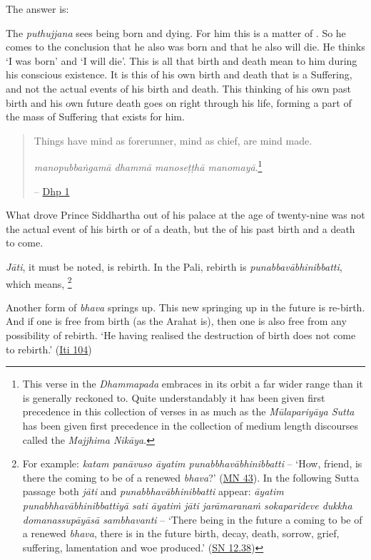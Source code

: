 The answer is:

The \emph{puthujjana} sees  being born and dying. For him this is a matter of . So he comes to the conclusion that he also was born and that he also will die. He thinks `I was born' and `I will die'. This is all that birth and death mean to him during his conscious existence. It is this  of his own birth and death that is a  Suffering, and not the actual events of his birth and death. This thinking of his own past birth and his own future death goes on right through his life, forming a part of the mass of Suffering that exists for him.

\begin{quote}
Things have mind as forerunner, mind as chief, are mind made.

\emph{manopubbaṅgamā dhammā manoseṭṭhā manomayā}.\footnote{This verse in the \emph{Dhammapada} embraces in its orbit a far wider range than it is generally reckoned to. Quite understandably it has been given first precedence in this collection of verses in as much as the \emph{Mūlapariyāya Sutta} has been given first precedence in the collection of medium length discourses called the \emph{Majjhima Nikāya}.}

 -- \href{https://suttacentral.net/dhp1-20/en/anandajoti}{Dhp 1}
\end{quote}

What drove Prince Siddhartha out of his palace at the age of twenty-nine was not the actual event of his birth or of a death, but the  of his past birth and a death to come.

\emph{Jāti}, it must be noted, is  rebirth. In the Pali, rebirth is \emph{punabbavābhinibbatti}, which means, \footnote{For example: \emph{katam panāvuso āyatim punabbhavābhinibbatti} -- `How, friend, is there the coming to be of a renewed \emph{bhava}?' (\href{https://suttacentral.net/mn43/en/sujato}{MN 43}). In the following Sutta passage both \emph{jāti} and \emph{punabbhavābhinibbatti} appear: \emph{āyatim punabhhavābhinibbattiyā sati āyatiṁ jāti jarāmaranaṁ sokaparideve dukkha domanassupāyāsā sambhavanti} -- `There being in the future a coming to be of a renewed \emph{bhava}, there is in the future birth, decay, death, sorrow, grief, suffering, lamentation and woe produced.' (\href{https://suttacentral.net/sn12.38/en/bodhi}{SN 12.38})}

Another form of \emph{bhava} springs up. This new springing up in the future is re-birth. And if one is free from birth (as the Arahat is), then one is also free from any possibility of rebirth. `He having realised the destruction of birth does not come to rebirth.' (\href{https://suttacentral.net/iti104/en/sujato}{Iti 104})

